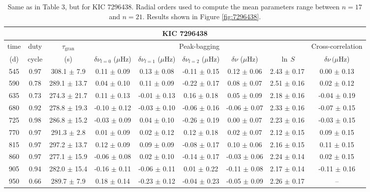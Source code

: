 \documentclass[twocolumn]{aastex61}%
\begin{document}
\begin{table*}[ht]\centering\fontsize{9.}{7.}\selectfont
\begin{tabular}{ccc|ccccc|c}
\multicolumn{9}{c}{KIC 7296438}\\ \hline\hline
time & duty & $\tau_\text{gran}$ &\multicolumn{5}{c|}{Peak-bagging}&Cross-correlation\\
(d)& cycle & (s)&$\delta\nu_{l=0}$ ($\mu$Hz) & $\delta\nu_{l=1}$ ($\mu$Hz) & $\delta\nu_{l=2}$ ($\mu$Hz) & $\delta\nu$ ($\mu$Hz)& $\ln\,S$ & $\delta\nu\,(\mu$Hz)\\\hline
545 & 0.97 & 308.1 $\pm$ 7.9 & 0.11 $\pm$ 0.09 & 0.13 $\pm$ 0.08 & -0.11 $\pm$ 0.15 & 0.12 $\pm$ 0.06 & 2.43 $\pm$ 0.17 & 0.00 $\pm$ 0.13\\
590 & 0.78 & 289.1 $\pm$ 13.7 & 0.04 $\pm$ 0.10 & 0.11 $\pm$ 0.09 & -0.22 $\pm$ 0.17 & 0.08 $\pm$ 0.07 & 2.51 $\pm$ 0.16 & 0.02 $\pm$ 0.12\\
635 & 0.73 & 274.3 $\pm$ 21.7 & 0.11 $\pm$ 0.13 & -0.01 $\pm$ 0.13 & 0.16 $\pm$ 0.18 & 0.05 $\pm$ 0.09 & 2.18 $\pm$ 0.16 & -0.04 $\pm$ 0.19\\
680 & 0.92 & 278.8 $\pm$ 19.3 & -0.10 $\pm$ 0.12 & -0.03 $\pm$ 0.10 & -0.06 $\pm$ 0.16 & -0.06 $\pm$ 0.07 & 2.33 $\pm$ 0.16 & -0.07 $\pm$ 0.15\\
725 & 0.98 & 286.8 $\pm$ 15.2 & -0.03 $\pm$ 0.09 & 0.04 $\pm$ 0.10 & -0.26 $\pm$ 0.19 & 0.00 $\pm$ 0.07 & 2.23 $\pm$ 0.16 & -0.03 $\pm$ 0.15\\
770 & 0.97 & 291.3 $\pm$ 2.8 & 0.01 $\pm$ 0.09 & 0.02 $\pm$ 0.12 & 0.12 $\pm$ 0.18 & 0.02 $\pm$ 0.07 & 2.12 $\pm$ 0.15 & 0.09 $\pm$ 0.15\\
815 & 0.97 & 297.2 $\pm$ 13.7 & 0.12 $\pm$ 0.09 & 0.09 $\pm$ 0.09 & -0.08 $\pm$ 0.17 & 0.10 $\pm$ 0.06 & 2.16 $\pm$ 0.15 & 0.11 $\pm$ 0.15\\
860 & 0.97 & 277.1 $\pm$ 15.9 & -0.06 $\pm$ 0.08 & 0.02 $\pm$ 0.10 & -0.14 $\pm$ 0.17 & -0.03 $\pm$ 0.06 & 2.24 $\pm$ 0.14 & 0.02 $\pm$ 0.15\\
905 & 0.94 & 282.0 $\pm$ 15.4 & -0.16 $\pm$ 0.11 & -0.06 $\pm$ 0.11 & 0.01 $\pm$ 0.22 & -0.11 $\pm$ 0.08 & 2.17 $\pm$ 0.14 & -0.11 $\pm$ 0.16\\
950 & 0.66 & 289.7 $\pm$ 7.9 & 0.18 $\pm$ 0.14 & -0.23 $\pm$ 0.12 & -0.04 $\pm$ 0.23 & -0.05 $\pm$ 0.09 & 2.26 $\pm$ 0.17 & --\\
\end{tabular}
\caption{Same as in Table 3, but for KIC 7296438. Radial orders used to compute the mean parameters range between $n=17$ and $n=21$. Results shown in Figure \ref{fig:7296438}.}\label{tab:7296438}
\end{table*}
\end{document}
